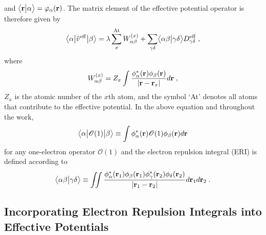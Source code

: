 %
and $\bigl\langle {\bf r} \bigl\lvert {\alpha} \bigr\rangle = \varphi_\alpha({\bf r})$.
The matrix element of the effective potential operator
is therefore given by
%
\begin{equation}
	\bigl\langle {\alpha} \bigl\lvert { \hat{v}^{\rm eff} } \bigl\lvert {\beta} \bigr\rangle
	= \lambda \sum_x^{\rm At} W_{\alpha\beta}^{(x)} +
        \sum_{\gamma\delta} \bigl\langle {\alpha\beta} \bigl\lvert {\gamma\delta} \bigr\rangle D^{\rm eff}_{\gamma\delta}  \;,
\end{equation}
%
where 
%
\begin{equation}
 W_{\alpha\beta}^{(x)} = 
 Z_x \int \frac{\phi^*_\alpha({\bf r}) \phi_\beta({\bf r})}{\vert {\bf r} - {\bf r}_x \vert} d{\bf r} \;,
\end{equation}
%
$Z_x$ is the atomic number of the $x$th atom,
and the symbol `At' denotes all atoms that contribute to the effective potential.
In the above equation and throughout the work, 
%
\begin{equation}
\bigl\langle {\alpha} \bigl\lvert {\mathscr{O}(1)} \bigl\lvert {\beta} \bigr\rangle \equiv \int \phi^*_\alpha({\bf r}) \mathscr{O}(1) \phi_\beta({\bf r}) d{\bf r} 
\end{equation}
%
for any one\hyp{}electron operator $\mathscr{O}(1)$ 
and the electron repulsion integral (ERI)
is defined according to
%
\begin{equation}
	\bigl\langle {\alpha\beta} \bigl\lvert {\gamma\delta} \bigr\rangle \equiv
	\iint 
	\frac{ \phi_\alpha^{*}({\bf r}_1) \phi_\beta({\bf r}_1) 
	       \phi_\gamma^{*}({\bf r}_2) \phi_\delta({\bf r}_2) }{ \vert {\bf r}_1 - {\bf r}_2 \vert}
	d{\bf r}_1 d{\bf r}_2  \;.
\end{equation}
%


\subsection{\label{ss:2.3}Incorporating Electron Repulsion Integrals into Effective Potentials}

